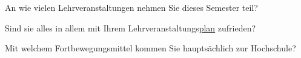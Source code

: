 %
%
%



\separate

\begin{choicequestion}[6]{An wie vielen Lehrveranstaltungen nehmen Sie dieses Semester teil?}
\end{choicequestion}

\separate

\begin{choicequestion}[1]{Sind sie alles in allem mit Ihrem Lehrveranstaltungs\underline{plan} zufrieden?}
\end{choicequestion}

\separate

\begin{choicequestion}[1]{Mit welchem Fortbewegungsmittel kommen Sie hauptsächlich zur Hochschule?}
\end{choicequestion}
